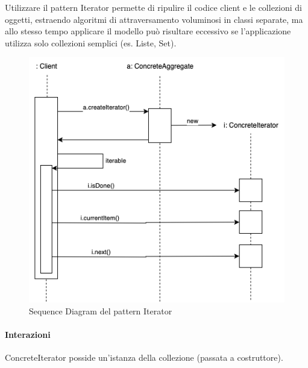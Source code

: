 Utilizzare il pattern Iterator permette di ripulire il codice client e le collezioni di oggetti, estraendo algoritmi di attraversamento voluminosi in classi separate, ma allo stesso tempo applicare il modello può risultare eccessivo se l'applicazione utilizza solo collezioni semplici (es. Liste, Set).

\begin{figure}[H]
    \centering
    \includegraphics[width=1\linewidth]{assets/pattern/iterator/iterator-sequence.drawio.png}
    \caption{Sequence Diagram del pattern Iterator}
\end{figure}

\paragraph{Interazioni} ConcreteIterator posside un'istanza della collezione (passata a costruttore).

\newpage